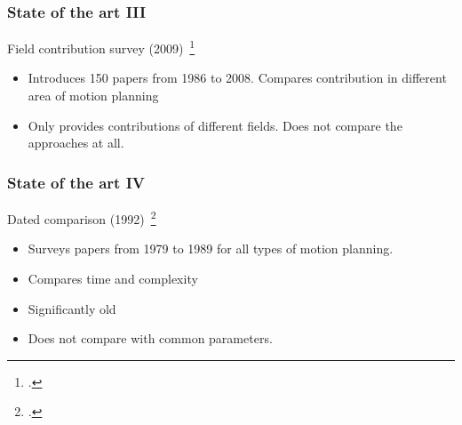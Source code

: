 \documentclass{beamer}
\begin{document}
\begin{frame}
    \frametitle{\huge{State of the art III}}
    \begin{block}{Field contribution survey (2009)~\footcite{keshmiri2009overview}}
        \begin{itemize}
            \color{blue} \item Introduces 150 papers from 1986 to 2008. Compares 
            contribution in different area of motion planning
            \color{red}   \item Only provides contributions of different fields. 
            Does not compare the approaches at all.
        \end{itemize}
    \end{block}
\end{frame}

\begin{frame}
    \frametitle{\huge{State of the art IV}}
    \begin{block}{Dated comparison (1992)~\footcite{hwang1992gross}}
        \begin{itemize}
            \color{blue} \item Surveys papers from 1979 to 1989 for all types of 
            motion planning.
            \color{blue} \item Compares time and complexity
            \color{red} \item Significantly old 
            \color{red} \item Does not compare with common parameters.
        \end{itemize}
    \end{block}
\end{frame}

\end{document}
